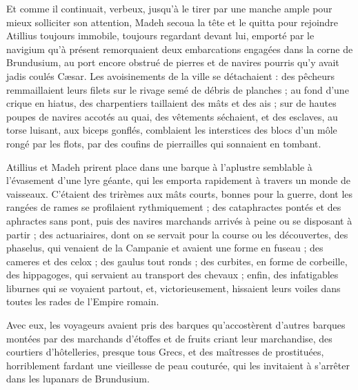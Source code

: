 \documentclass[a4paper, 11pt, oneside, polutonikogreek, french]{article}
\begin{document}
Et comme il continuait, verbeux, jusqu'à le tirer par une manche ample pour mieux solliciter son attention, Madeh secoua la tête et le quitta pour rejoindre Atillius toujours immobile, toujours regardant devant lui, emporté par le navigium qu'à présent remorquaient deux embarcations engagées dans la corne de Brundusium, au port encore obstrué de pierres et de navires pourris qu'y avait jadis coulés Cæsar. Les avoisinements de la ville se détachaient : des pêcheurs remmaillaient leurs filets sur le rivage semé de débris de planches ; au fond d'une crique en hiatus, des charpentiers taillaient des mâts et des ais ; sur de hautes poupes de navires accotés au quai, des vêtements séchaient, et des esclaves, au torse luisant, aux biceps gonflés, comblaient les interstices des blocs d'un môle rongé par les flots, par des coufins de pierrailles qui sonnaient en tombant.

Atillius et Madeh prirent place dans une barque à l'aplustre semblable à l'évasement d'une lyre géante, qui les emporta rapidement à travers un monde de vaisseaux. C'étaient des trirèmes aux mâts courts, bonnes pour la guerre, dont les rangées de rames se profilaient rythmiquement ; des cataphractes pontés et des aphractes sans pont, puis des navires marchands arrivés à peine ou se disposant à partir ; des actuariaires, dont on se servait pour la course ou les découvertes, des phaselus, qui venaient de la Campanie et avaient une forme en fuseau ; des cameres et des celox ; des gaulus tout ronds ; des curbites, en forme de corbeille, des hippagoges, qui servaient au transport des chevaux ; enfin, des infatigables liburnes qui se voyaient partout, et, victorieusement, hissaient leurs voiles dans toutes les rades de l'Empire romain.

Avec eux, les voyageurs avaient pris des barques qu'accostèrent d'autres barques montées par des marchands d'étoffes et de fruits criant leur marchandise, des courtiers d'hôtelleries, presque tous Grecs, et des maîtresses de prostituées, horriblement fardant une vieillesse de peau couturée, qui les invitaient à s'arrêter dans les lupanars de Brundusium.
\end{document}
